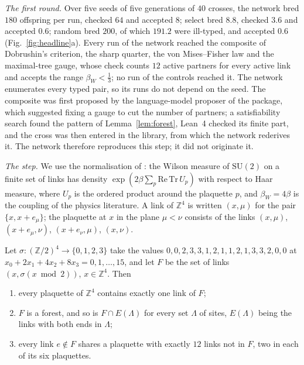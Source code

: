 \emph{The first round.} Over five seeds of five generations of $40$ crosses, the network bred $180$ offspring per run, checked $64$ and accepted $8$; select bred $8.8$, checked $3.6$ and accepted $0.6$; random bred $200$, of which $191.2$ were ill-typed, and accepted $0.6$ (Fig.~\ref{fig:headline}a). Every run of the network reached the composite of Dobrushin's criterion, the sharp quarter, the von Mises--Fisher law and the maximal-tree gauge, whose check counts $12$ active partners for every active link and accepts the range $\beta_{W}<\frac13$; no run of the controls reached it. The network enumerates every typed pair, so its runs do not depend on the seed. The composite was first proposed by the language-model proposer of the package, which suggested fixing a gauge to cut the number of partners; a satisfiability search found the pattern of Lemma~\ref{lem:forest}, Lean~4 checked its finite part, and the cross was then entered in the library, from which the network rederives it. The network therefore reproduces this step; it did not originate it.

\emph{The step.} We use the normalisation of \cite{SZZ23,BB26d}: the Wilson measure of $\mathrm{SU}(2)$ on a finite set of links has density $\exp(2\beta\sum_{p}\mathrm{Re}\,\mathrm{Tr}\,U_{p})$ with respect to Haar measure, where $U_{p}$ is the ordered product around the plaquette $p$, and $\beta_{W}=4\beta$ is the coupling of the physics literature. A link of $\mathbb{Z}^{4}$ is written $(x,\mu)$ for the pair $\{x,x+e_{\mu}\}$; the plaquette at $x$ in the plane $\mu<\nu$ consists of the links $(x,\mu)$, $(x+e_{\mu},\nu)$, $(x+e_{\nu},\mu)$, $(x,\nu)$.

\begin{lemma}\label{lem:forest}
Let $\sigma\colon(\mathbb{Z}/2)^{4}\to\{0,1,2,3\}$ take the values $0,0,2,3,3,1,2,1,1,2,1,3,3,2,0,0$ at $x_{0}+2x_{1}+4x_{2}+8x_{3}=0,1,\dots,15$, and let $F$ be the set of links $(x,\sigma(x\bmod2))$, $x\in\mathbb{Z}^{4}$. Then
\begin{enumerate}[label=\textup{(\roman*)},leftmargin=*,itemsep=0pt]
\item every plaquette of $\mathbb{Z}^{4}$ contains exactly one link of $F$;
\item $F$ is a forest, and so is $F\cap E(\Lambda)$ for every set $\Lambda$ of sites, $E(\Lambda)$ being the links with both ends in $\Lambda$;
\item every link $e\notin F$ shares a plaquette with exactly $12$ links not in $F$, two in each of its six plaquettes.
\end{enumerate}
\end{lemma}

